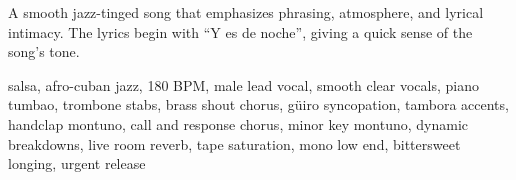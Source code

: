 
\label{sec:guiro-quemado}

\begin{notes}
A smooth jazz-tinged song that emphasizes phrasing, atmosphere, and lyrical intimacy. %
The lyrics begin with “Y es de noche”, giving a quick sense of the song’s tone.
\end{notes}

\begin{style}
salsa, afro-cuban jazz, 180 BPM, male lead vocal, smooth clear vocals, piano tumbao, trombone stabs, brass shout chorus, güiro syncopation, tambora accents, handclap montuno, call and response chorus, minor key montuno, dynamic breakdowns, live room reverb, tape saturation, mono low end, bittersweet longing, urgent release
\end{style}

